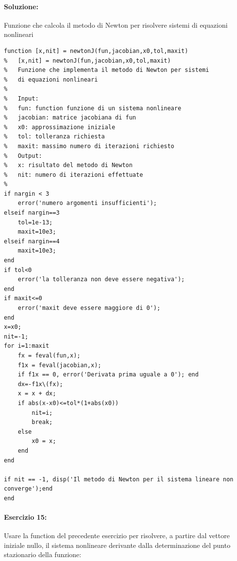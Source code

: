 \documentclass[12pt]{article}
\begin{document}
\paragraph{Soluzione:} Funzione che calcola  il metodo di Newton per risolvere sistemi di equazioni nonlineari
\begin{lstlisting}[frame=single]
function [x,nit] = newtonJ(fun,jacobian,x0,tol,maxit)
%   [x,nit] = newtonJ(fun,jacobian,x0,tol,maxit)
%   Funzione che implementa il metodo di Newton per sistemi 
%   di equazioni nonlineari
%   
%   Input:
%   fun: function funzione di un sistema nonlineare
%   jacobian: matrice jacobiana di fun
%   x0: approssimazione iniziale
%   tol: tolleranza richiesta
%   maxit: massimo numero di iterazioni richiesto
%   Output:
%   x: risultato del metodo di Newton
%   nit: numero di iterazioni effettuate
%
if nargin < 3
    error('numero argomenti insufficienti');
elseif nargin==3
    tol=1e-13;
    maxit=10e3;
elseif nargin==4
    maxit=10e3;
end
if tol<0
    error('la tolleranza non deve essere negativa');
end
if maxit<=0
    error('maxit deve essere maggiore di 0');
end
x=x0;
nit=-1;
for i=1:maxit
    fx = feval(fun,x);
    f1x = feval(jacobian,x);
    if f1x == 0, error('Derivata prima uguale a 0'); end
    dx=-f1x\(fx);
    x = x + dx;
    if abs(x-x0)<=tol*(1+abs(x0))
        nit=i;
        break;
    else
        x0 = x;
    end
end

if nit == -1, disp('Il metodo di Newton per il sistema lineare non converge');end
end    
\end{lstlisting}



\newpage
\paragraph{Esercizio 15:} Usare la function del precedente esercizio per risolvere, a partire dal vettore iniziale nullo, 
il sistema nonlineare derivante dalla determinazione del punto stazionario della funzione:
\end{document}

